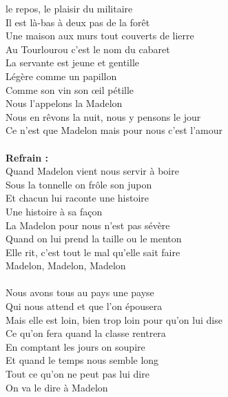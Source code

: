 
 le repos, le plaisir du militaire
\\Il est là-bas à deux pas de la forêt
\\Une maison aux murs tout couverts de lierre
\\Au Tourlourou c'est le nom du cabaret
\\La servante est jeune et gentille
\\Légère comme un papillon
\\Comme son vin son œil pétille
\\Nous l'appelons la Madelon
\\Nous en rêvons la nuit, nous y pensons le jour
\\Ce n'est que Madelon mais pour nous c'est l'amour
\\\\\textbf{Refrain :}
\\Quand Madelon vient nous servir à boire
\\Sous la tonnelle on frôle son jupon
\\Et chacun lui raconte une histoire
\\Une histoire à sa façon
\\La Madelon pour nous n'est pas sévère
\\Quand on lui prend la taille ou le menton
\\Elle rit, c'est tout le mal qu'elle sait faire
\\Madelon, Madelon, Madelon
\\\\Nous avons tous au pays une payse
\\Qui nous attend et que l'on épousera
\\Mais elle est loin, bien trop loin pour qu'on lui dise
\\Ce qu'on fera quand la classe rentrera
\\En comptant les jours on soupire
\\Et quand le temps nous semble long
\\Tout ce qu'on ne peut pas lui dire
\\On va le dire à Madelon
